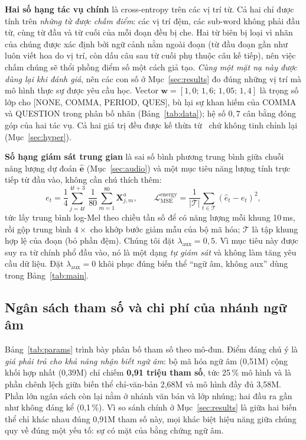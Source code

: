 \documentclass[conference,onecolumn]{IEEEtran}
\begin{document}
\textbf{Hai số hạng tác vụ chính} là cross-entropy trên các vị trí từ. Cả hai chỉ
được tính trên \emph{những từ được chấm điểm}: các vị trí đệm, các sub-word không
phải đầu từ, cùng từ đầu và từ cuối của mỗi đoạn đều bị che. Hai từ biên bị loại
vì nhãn của chúng được xác định bởi ngữ cảnh nằm ngoài đoạn (từ đầu đoạn gần như
luôn viết hoa do vị trí, còn dấu câu sau từ cuối phụ thuộc câu kế tiếp), nên việc
chấm chúng sẽ thổi phồng điểm số một cách giả tạo. \emph{Cùng một mặt nạ này được
dùng lại khi đánh giá}, nên các con số ở Mục~\ref{sec:results} đo đúng những vị trí
mà mô hình thực sự được yêu cầu học.
Vector $\mathbf{w}=[1{,}0;\,1{,}6;\,1{,}05;\,1{,}4]$ là trọng số lớp cho
[NONE, COMMA, PERIOD, QUES], bù lại sự khan hiếm của COMMA và QUESTION trong phân
bố nhãn (Bảng~\ref{tab:data}); hệ số $0{,}7$ cân bằng đóng góp của hai tác vụ. Cả
hai giá trị đều được kế thừa từ~\cite{you2024lightweight} chứ không tinh chỉnh lại
(Mục~\ref{sec:hyper}).

\textbf{Số hạng giám sát trung gian} là sai số bình phương trung bình giữa chuỗi
năng lượng dự đoán $\hat{\mathbf{e}}$ (Mục~\ref{sec:audio}) và một mục tiêu năng
lượng tính trực tiếp từ đầu vào, không cần chú thích thêm:
\begin{equation}
e_t = \frac{1}{4}\sum_{j=4t}^{4t+3}\ \frac{1}{80}\sum_{m=1}^{80} \mathbf{X}^{a}_{j,m},
\qquad
\mathcal{L}_{\mathrm{MSE}}^{\mathrm{energy}}
  = \frac{1}{|\mathcal{T}|}\sum_{t\in\mathcal{T}} (\hat{e}_t - e_t)^2 ,
\end{equation}
tức lấy trung bình log-Mel theo chiều tần số để có năng lượng mỗi khung 10\,ms,
rồi gộp trung bình $4\times$ cho khớp bước giảm mẫu của bộ mã hóa; $\mathcal{T}$ là
tập khung hợp lệ của đoạn (bỏ phần đệm). Chúng tôi đặt
$\lambda_{\mathrm{aux}}=0{,}5$. Vì mục tiêu này được suy ra từ chính phổ đầu vào,
nó là một dạng \emph{tự giám sát} và không làm tăng yêu cầu dữ liệu. Đặt
$\lambda_{\mathrm{aux}}=0$ khôi phục đúng biến thể ``ngữ âm, không aux'' dùng trong
Bảng~\ref{tab:main}.

\subsection{Ngân sách tham số và chi phí của nhánh ngữ âm}
\label{sec:budget}
Bảng~\ref{tab:params} trình bày phân bố tham số theo mô-đun. Điểm đáng chú ý là
\emph{giá phải trả cho khả năng nhận biết ngữ âm}: bộ mã hóa ngữ âm (0{,}51M) cộng
khối hợp nhất (0{,}39M) chỉ chiếm \textbf{0{,}91 triệu tham số}, tức 25\,\% mô hình
và là phần chênh lệch giữa biến thể chỉ-văn-bản 2{,}68M và mô hình đầy đủ 3{,}58M.
Phần lớn ngân sách còn lại nằm ở nhánh văn bản và lớp nhúng; hai đầu ra gần như
không đáng kể (0{,}1\,\%). Vì so sánh chính ở Mục~\ref{sec:results} là giữa hai
biến thể chỉ khác nhau đúng 0{,}91M tham số này, mọi khác biệt hiệu năng giữa
chúng quy về đúng một yếu tố: sự có mặt của bằng chứng ngữ âm.
\end{document}
